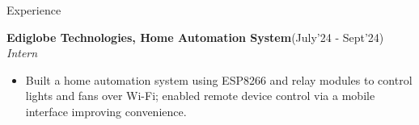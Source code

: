 \begin{rSection}{Experience}
\begin{itemize}[leftmargin=*]
\end{itemize}

\item{\bf {\bf Ediglobe Technologies, Home Automation System}}\hfill{(July'24 - Sept'24)}\\
\emph{Intern}\\
[-0.4cm]

\begin{itemize}[leftmargin=*]

  \itemsep \sepval

  \item Built a home automation system using ESP8266 and relay modules to control lights and fans over Wi-Fi; enabled remote device control via a mobile interface improving convenience.

\end{itemize}

\end{rSection}
